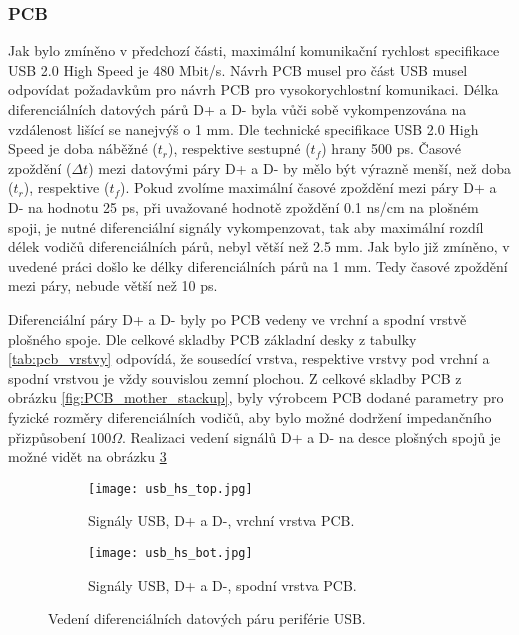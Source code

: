 	\subsubsection{PCB}
	Jak bylo zmíněno v předchozí části, maximální komunikační rychlost specifikace USB 2.0 High Speed je 480 Mbit/s. Návrh PCB musel pro část USB musel odpovídat požadavkům pro návrh PCB pro vysokorychlostní komunikaci. Délka diferenciálních datových párů D+ a D- byla vůči sobě vykompenzována na vzdálenost lišící se nanejvýš o 1 mm. Dle technické specifikace USB 2.0 High Speed je doba náběžné ($t_r$), respektive sestupné ($t_f$) hrany 500 ps. Časové zpoždění ($\Delta t$) mezi datovými páry D+ a D- by mělo být výrazně menší, než doba ($t_r$), respektive ($t_f$). Pokud zvolíme maximální časové zpoždění mezi páry D+ a D- na hodnotu 25 ps, při uvažované hodnotě zpoždění 0.1 ns/cm na plošném spoji, je nutné diferenciální signály vykompenzovat, tak aby maximální rozdíl délek vodičů diferenciálních párů, nebyl větší než 2.5 mm. Jak bylo již zmíněno, v uvedené práci došlo ke délky diferenciálních párů na 1 mm. Tedy časové zpoždění mezi páry, nebude větší než 10 ps.
	\par Diferenciální páry D+ a D- byly po PCB vedeny ve vrchní a spodní vrstvě plošného spoje. Dle celkové skladby PCB základní desky z tabulky \ref{tab:pcb_vrstvy} odpovídá, že sousedící vrstva, respektive vrstvy pod vrchní a spodní vrstvou je vždy souvislou zemní plochou. Z celkové skladby PCB z obrázku \ref{fig:PCB_mother_stackup}, byly výrobcem PCB dodané parametry pro fyzické rozměry diferenciálních vodičů, aby bylo možné dodržení impedančního přizpůsobení $100 \Omega$. Realizaci vedení signálů D+ a D- na desce plošných spojů je možné vidět na obrázku \ref{fig:usb_layout}
	
	\begin{figure}[h!]
		\begin{subfigure}{0.5\textwidth}
			\centering
			\captionsetup{justification=centering}
			\texttt{[image: usb\_hs\_top.jpg]}
			\caption{Signály USB, D+ a D-, vrchní vrstva PCB.} 
			\label{fig:usb_top}
		\end{subfigure} \hfill
		\begin{subfigure}{0.5\textwidth}
			\centering
			\captionsetup{justification=centering}
			\texttt{[image: usb\_hs\_bot.jpg]}
			\caption{Signály USB, D+ a D-, spodní vrstva PCB.} 
			\label{fig:usb_bot}
		\end{subfigure}
		\caption{Vedení diferenciálních datových páru periférie USB.}
		\label{fig:usb_layout}
	\end{figure} 


